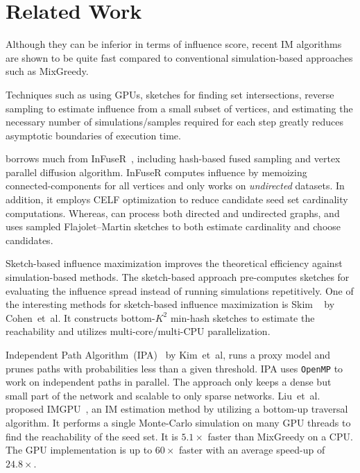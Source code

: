 \documentclass[10pt,journal,compsoc]{IEEEtran}
\newcommand\acro{{\sc{HyperFuseR\xspace}\xspace}\xspace}
\begin{document}
\section{Related Work}\label{sec:relatedwork}

Although they can be inferior in terms of influence score, recent IM algorithms are shown to be quite fast compared to conventional simulation-based approaches such as {\sc MixGreedy}. 

Techniques such as using GPUs\cite{IMGPU,curipples}, sketches for finding set intersections\cite{cohen2014sketch,IPA}, reverse sampling to estimate influence from a small subset of vertices\cite{borgs2014maximizing,minutoli2019fast}, and estimating the necessary number of simulations/samples required for each step greatly reduces asymptotic boundaries of execution time\cite{leskovec2009community}.

\acro borrows much from {\sc InFuseR}~\cite{infuser}, including hash-based fused sampling and vertex parallel diffusion algorithm. {\sc InFuseR} computes influence by memoizing connected-components for all vertices and only works on {\em undirected} datasets. In addition, it employs CELF optimization to reduce candidate seed set cardinality computations. Whereas, \acro can process both directed and undirected graphs, and uses sampled Flajolet–Martin sketches to both estimate cardinality and choose candidates. 

Sketch-based influence maximization improves the theoretical efficiency against simulation-based methods. The sketch-based approach pre-computes sketches for evaluating the influence spread instead of running simulations repetitively. One of the interesting methods for sketch-based influence maximization is {\sc Skim} ~\cite{cohen2014sketch} by Cohen~et~al. It constructs bottom-$K^2$ min-hash sketches to estimate the reachability and utilizes multi-core/multi-CPU parallelization. 

Independent Path Algorithm~(IPA)~\cite{IPA} by Kim~et~al, runs a proxy model and prunes paths with probabilities less than a given threshold. IPA uses {\tt OpenMP} to work on independent paths in parallel. The approach only keeps a dense but small part of the network and scalable to only sparse networks. Liu~et~al. proposed IMGPU~\cite{IMGPU}, an IM  estimation method by utilizing a bottom-up traversal algorithm. It performs a single Monte-Carlo simulation on many GPU threads to find the reachability of the seed set. It is $5.1\times$ faster than {\sc MixGreedy} on a CPU. The GPU implementation is up to $60\times$ faster with an average speed-up of  $24.8\times$.
\end{document}
